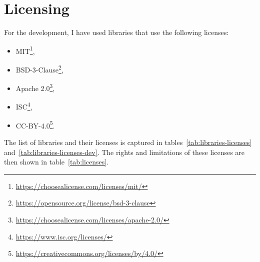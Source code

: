 \section{Licensing}
For the development, I have used libraries that use the following licenses:
\begin{itemize}
    \item MIT\footnote{\url{https://choosealicense.com/licenses/mit/}},
    \item BSD-3-Clause\footnote{\url{https://opensource.org/license/bsd-3-clause}},
    \item Apache 2.0\footnote{\url{https://choosealicense.com/licenses/apache-2.0/}},
    \item ISC\footnote{\url{https://www.isc.org/licenses/}},
    \item CC-BY-4.0\footnote{\url{https://creativecommons.org/licenses/by/4.0/}}.
\end{itemize}

The list of libraries and their licenses is captured in tables~\ref{tab:libraries-licenses} and~\ref{tab:libraries-licenses-dev}.
The rights and limitations of these licenses are then shown in table~\ref{tab:licenses}.


